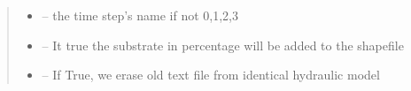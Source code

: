 \documentclass[letterpaper,10pt,english]{sphinxmanual}
\begin{document}
\begin{fulllineitems}
\begin{quote}
\begin{description}
\begin{itemize}
\item {} 
 -- the time step's name if not 0,1,2,3

\item {} 
 -- It true the substrate in percentage will be added to the shapefile

\item {} 
 -- If True, we erase old text file from identical hydraulic model

\end{itemize}

\end{description}\end{quote}

\end{fulllineitems}

\end{document}
